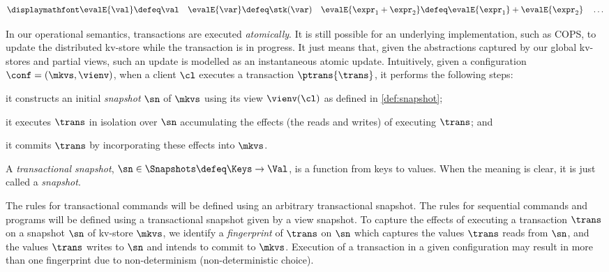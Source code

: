 \vspace{-5pt}
{%
\[
\displaymathfont
\begin{gathered}
\evalE{\val} \defeq
\val
\quad
\evalE{\var} \defeq
\stk(\var)
\quad
\evalE{\expr_{1} + \expr_{2}} \defeq
\evalE{\expr_{1}} + \evalE{\expr_{2}}
\quad
\dots
\end{gathered}%
\]
}%

   In our operational semantics, transactions are executed
\emph{atomically}. It is still possible for an underlying
implementation, such as COPS, to update the distributed kv-store while
the transaction is in progress. It just means that, given the
abstractions captured by our global kv-stores and partial views, 
such an update is modelled as  an instantaneous  atomic
update.
Intuitively, given a configuration $\conf = (\mkvs, \vienv)$, 
when a client $\cl$ executes a transaction $\ptrans{\trans}$, 
it performs the following steps: 
\begin{enumerate*}
	\item it constructs an initial \emph{snapshot} $\sn$ of $\mkvs$ using its view $\vienv(\cl)$ as defined in \cref{def:snapshot};  
	\item it executes $\trans$ in isolation over $\sn$
        accumulating the effects (the reads and writes) of executing $\trans$; and
	\item it commits $\trans$ by incorporating these effects into $\mkvs$.
\end{enumerate*}

\begin{definition}
\label{def:heaps}
A \emph{transactional snapshot}, \( \sn \in \Snapshots \defeq \Keys \to
\Val\),  is a function from keys to values. When the meaning is clear,
it is just called a {\em snapshot}. 
\end{definition}

The rules for transactional commands will be defined  using an arbitrary 
transactional snapshot. The rules for sequential
commands and programs will be defined  using a transactional
snapshot given by a view snapshot. 
To capture the effects of executing a transaction $\trans$ on a snapshot $\sn$ of kv-store $\mkvs$, 
we identify a \emph{fingerprint}  of $\trans$ on $\sn$ which captures
 the values $\trans$ reads from $\sn$, and
the values $\trans$ writes to $\sn$ and intends to commit to $\mkvs$. 
Execution of a transaction in a given configuration may result in more than one fingerprint due to non-determinism (non-deterministic choice). 


